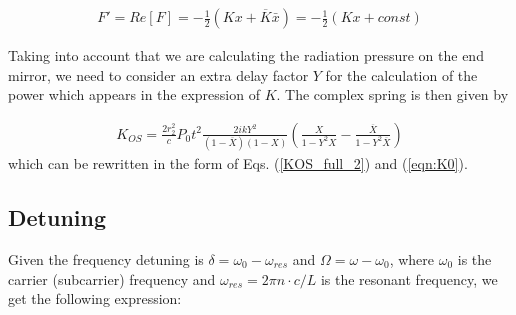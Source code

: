 \begin{align*}
F'=Re[F]=-\frac{1}{2}(Kx+\overline{K}\bar{x})=-\frac{1}{2}(Kx+const)
\end{align*}

Taking into account that we are calculating the radiation pressure on the end mirror, we need to consider an extra delay factor $Y$
for the calculation of the power which appears in the expression of $K$. The complex spring is then given by 

\begin{align*}
K_{OS}=\frac{2 r_2^2}{c} P_0 t^2  \frac{2ikY^2}{(1-\overline{X})(1-X)} \left( \frac{X}{1-Y^2 X}-\frac{\overline{X}}{1-Y^2\overline{X}} \right) 
\end{align*}
which can be rewritten in the form of Eqs. (\ref{KOS_full_2}) and (\ref{eqn:K0}).


\subsection{Detuning}
Given the frequency detuning is $\delta=\omega_0-\omega_{res}$ and $\Omega=\omega-\omega_0$,
where $\omega_0$ is the carrier (subcarrier) frequency and $\omega_{res}=2\pi n\cdot c/L$ is the resonant frequency, we get the following expression:

%

